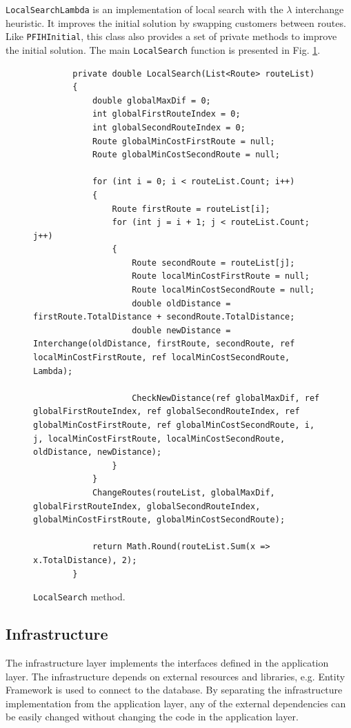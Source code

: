 \documentclass[a4paper,twoside,12pt]{book}
\begin{document}
\lstinline{LocalSearchLambda} is an implementation of local search with the $\lambda$ interchange heuristic. It improves the initial solution by swapping customers between routes. Like \lstinline{PFIHInitial}, this class also provides a set of private methods to improve the initial solution. The main \lstinline{LocalSearch} function is presented in Fig. \ref{fig:localSearch}.

\begin{figure}
\centering
\begin{lstlisting}
        private double LocalSearch(List<Route> routeList)
        {
            double globalMaxDif = 0;
            int globalFirstRouteIndex = 0;
            int globalSecondRouteIndex = 0;
            Route globalMinCostFirstRoute = null;
            Route globalMinCostSecondRoute = null;

            for (int i = 0; i < routeList.Count; i++)
            {
                Route firstRoute = routeList[i];
                for (int j = i + 1; j < routeList.Count; j++)
                {
                    Route secondRoute = routeList[j];
                    Route localMinCostFirstRoute = null;
                    Route localMinCostSecondRoute = null;
                    double oldDistance = firstRoute.TotalDistance + secondRoute.TotalDistance;
                    double newDistance = Interchange(oldDistance, firstRoute, secondRoute, ref localMinCostFirstRoute, ref localMinCostSecondRoute, Lambda);

                    CheckNewDistance(ref globalMaxDif, ref globalFirstRouteIndex, ref globalSecondRouteIndex, ref globalMinCostFirstRoute, ref globalMinCostSecondRoute, i, j, localMinCostFirstRoute, localMinCostSecondRoute, oldDistance, newDistance);
                }
            }
            ChangeRoutes(routeList, globalMaxDif, globalFirstRouteIndex, globalSecondRouteIndex, globalMinCostFirstRoute, globalMinCostSecondRoute);

            return Math.Round(routeList.Sum(x => x.TotalDistance), 2);
        }
\end{lstlisting}
\caption{\lstinline{LocalSearch} method.}
\label{fig:localSearch}
\end{figure}



\subsection{Infrastructure}

The infrastructure layer implements the interfaces defined in the application layer. The infrastructure depends on external resources and libraries, e.g. Entity Framework is used to connect to the database. By separating the infrastructure implementation from the application layer, any of the external dependencies can be easily changed without changing the code in the application layer. 
\end{document}
